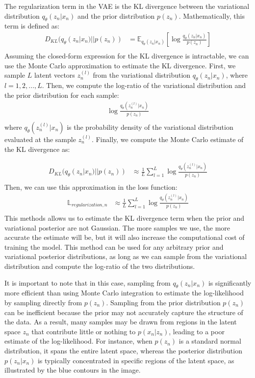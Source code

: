\documentclass{article}
\begin{document}
The regularization term in the VAE is the KL divergence between the variational distribution $q_{\theta}(z_n|x_n)$ and the prior distribution $p(z_n)$.
Mathematically, this term is defined as:
\begin{align*}
    D_{KL}(q_{\theta}(z_n|x_n) || p(z_n)) &= \mathbb{E}_{q_{\theta}(z_n|x_n)}[\log \frac{q_{\theta}(z_n|x_n)}{p(z_n)}] \\
\end{align*}
Assuming the closed-form expression for the KL divergence is intractable, we can use the Monte Carlo approximation to estimate the KL divergence.
First, we sample $L$ latent vectors $z_n^{(l)}$ from the variational distribution $q_{\theta}(z_n|x_n)$, where $l = 1, 2, ..., L$.
Then, we compute the log-ratio of the variational distribution and the prior distribution for each sample:
\begin{align*}
    \log \frac{q_{\theta}(z_n^{(l)}|x_n)}{p(z_n)} \\
\end{align*}
where $q_{\theta}(z_n^{(l)}|x_n)$ is the probability density of the variational distribution evaluated at the sample $z_n^{(l)}$.
Finally, we compute the Monte Carlo estimate of the KL divergence as:

\begin{align*}
    D_{KL}(q_{\theta}(z_n|x_n) || p(z_n)) &\approx \frac{1}{L} \sum_{l=1}^{L} \log \frac{q_{\theta}(z_n^{(l)}|x_n)}{p(z_n)} \\
\end{align*}
Then, we can use this approximation in the loss function:
\begin{align*}
    \mathbb{L}_{regularization,n} &\approx \frac{1}{L} \sum_{l=1}^{L} \log \frac{q_{\theta}(z_n^{(l)}|x_n)}{p(z_n)} \\
\end{align*}
This methods allows us to estimate the KL divergence term when the prior and variational posterior are not Gaussian. The more
samples we use, the more accurate the estimate will be, but it will also increase the computational cost of training the model.
This method can be used for any arbitrary prior and variational posterior distributions, as long as we can sample from the variational distribution
and compute the log-ratio of the two distributions.

It is important to note that in this case, sampling from \( q_{\theta}(z_n|x_n) \) is significantly more efficient than using Monte Carlo integration to estimate the log-likelihood by sampling directly from \( p(z_n) \). Sampling from the prior distribution \( p(z_n) \) can be inefficient because the prior may not accurately capture the structure of the data. As a result, many samples may be drawn from regions in the latent space \( z_n \) that contribute little or nothing to \( p(x_n | z_n) \), leading to a poor estimate of the log-likelihood. For instance, when \( p(z_n) \) is a standard normal distribution, it spans the entire latent space, whereas the posterior distribution \( p(z_n | x_n) \) is typically concentrated in specific regions of the latent space, as illustrated by the blue contours in the image.
\end{document}
